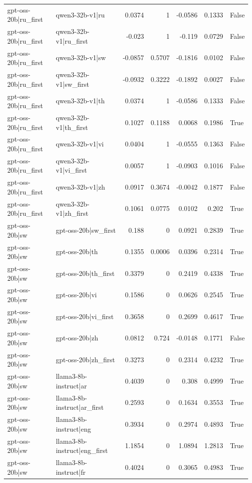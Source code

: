 \begin{table}
\begin{tabular}{l l r r r r l}
gpt-oss-20b|ru_first & qwen3-32b-v1|ru & 0.0374 & 1 & -0.0586 & 0.1333 & False \\
gpt-oss-20b|ru_first & qwen3-32b-v1|ru_first & -0.023 & 1 & -0.119 & 0.0729 & False \\
gpt-oss-20b|ru_first & qwen3-32b-v1|sw & -0.0857 & 0.5707 & -0.1816 & 0.0102 & False \\
gpt-oss-20b|ru_first & qwen3-32b-v1|sw_first & -0.0932 & 0.3222 & -0.1892 & 0.0027 & False \\
gpt-oss-20b|ru_first & qwen3-32b-v1|th & 0.0374 & 1 & -0.0586 & 0.1333 & False \\
gpt-oss-20b|ru_first & qwen3-32b-v1|th_first & 0.1027 & 0.1188 & 0.0068 & 0.1986 & True \\
gpt-oss-20b|ru_first & qwen3-32b-v1|vi & 0.0404 & 1 & -0.0555 & 0.1363 & False \\
gpt-oss-20b|ru_first & qwen3-32b-v1|vi_first & 0.0057 & 1 & -0.0903 & 0.1016 & False \\
gpt-oss-20b|ru_first & qwen3-32b-v1|zh & 0.0917 & 0.3674 & -0.0042 & 0.1877 & False \\
gpt-oss-20b|ru_first & qwen3-32b-v1|zh_first & 0.1061 & 0.0775 & 0.0102 & 0.202 & True \\
gpt-oss-20b|sw & gpt-oss-20b|sw_first & 0.188 & 0 & 0.0921 & 0.2839 & True \\
gpt-oss-20b|sw & gpt-oss-20b|th & 0.1355 & 0.0006 & 0.0396 & 0.2314 & True \\
gpt-oss-20b|sw & gpt-oss-20b|th_first & 0.3379 & 0 & 0.2419 & 0.4338 & True \\
gpt-oss-20b|sw & gpt-oss-20b|vi & 0.1586 & 0 & 0.0626 & 0.2545 & True \\
gpt-oss-20b|sw & gpt-oss-20b|vi_first & 0.3658 & 0 & 0.2699 & 0.4617 & True \\
gpt-oss-20b|sw & gpt-oss-20b|zh & 0.0812 & 0.724 & -0.0148 & 0.1771 & False \\
gpt-oss-20b|sw & gpt-oss-20b|zh_first & 0.3273 & 0 & 0.2314 & 0.4232 & True \\
gpt-oss-20b|sw & llama3-8b-instruct|ar & 0.4039 & 0 & 0.308 & 0.4999 & True \\
gpt-oss-20b|sw & llama3-8b-instruct|ar_first & 0.2593 & 0 & 0.1634 & 0.3553 & True \\
gpt-oss-20b|sw & llama3-8b-instruct|eng & 0.3934 & 0 & 0.2974 & 0.4893 & True \\
gpt-oss-20b|sw & llama3-8b-instruct|eng_first & 1.1854 & 0 & 1.0894 & 1.2813 & True \\
gpt-oss-20b|sw & llama3-8b-instruct|fr & 0.4024 & 0 & 0.3065 & 0.4983 & True \\

\end{tabular}
\end{table}
